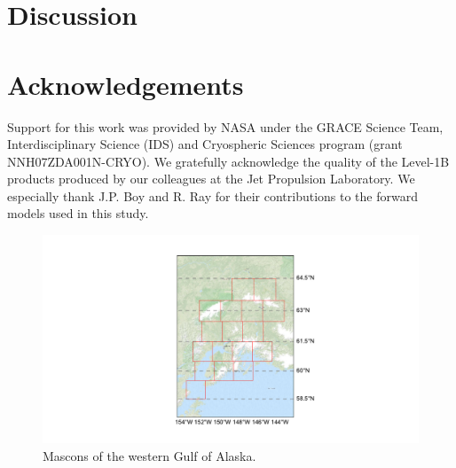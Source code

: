 \documentclass[review,oneside]{igs}
\begin{document}
\section{Discussion}

\section{Acknowledgements}

Support for this work was provided by NASA under the GRACE Science Team, Interdisciplinary Science (IDS) and Cryospheric Sciences program (grant NNH07ZDA001N-CRYO). We gratefully acknowledge the quality of the Level-1B products produced by our colleagues at the Jet Propulsion Laboratory. We especially thank J.P. Boy and R. Ray for their contributions to the forward models used in this study. 


%




\begin{figure}[h]
\noindent\includegraphics[width=178mm]{figures/westernMap} \centering \caption{Mascons of the western Gulf of Alaska.} \label{fig:wGOA_map}
\end{figure}
\end{document}
